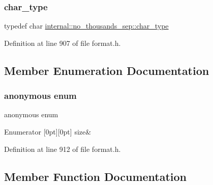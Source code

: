 \subsubsection{\texorpdfstring{char\+\_\+type}{char\_type}}
{\footnotesize\ttfamily typedef char \hyperlink{structinternal_1_1no__thousands__sep_a9b6389cef050e5086086d7fb75b0f482}{internal\+::no\+\_\+thousands\+\_\+sep\+::char\+\_\+type}}



Definition at line 907 of file format.\+h.



\subsection{Member Enumeration Documentation}
\mbox{\label{structinternal_1_1no__thousands__sep_a4f9f8b52aa954618eab526dbf2d7c461}} 
\subsubsection{\texorpdfstring{anonymous enum}{anonymous enum}}
{\footnotesize\ttfamily anonymous enum}

\begin{DoxyEnumFields}{Enumerator}
[0pt][0pt]{}\mbox{\label{structinternal_1_1no__thousands__sep_a4f9f8b52aa954618eab526dbf2d7c461ab59a66813dc5be02761295636420ca1b}} 
size&\\
\hline

\end{DoxyEnumFields}


Definition at line 912 of file format.\+h.



\subsection{Member Function Documentation}
\mbox{\label{structinternal_1_1no__thousands__sep_a2813f32ecaa85d5dcd0719a30b9a7775}} 
